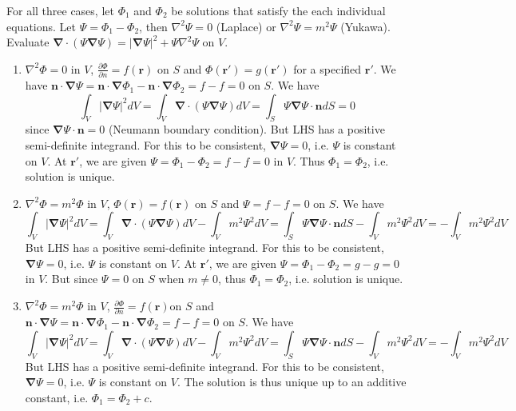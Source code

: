 \documentclass[a4paper]{article}
\begin{document}
\begin{ans}
For all three cases, let $\Phi_1$ and $\Phi_2$ be solutions that satisfy the each individual equations. Let $\Psi=\Phi_1-\Phi_2$, then $\nabla^2\Psi=0$ (Laplace) or $\nabla^2\Psi=m^2\Psi$ (Yukawa). Evaluate $\boldsymbol{\nabla}\cdot(\Psi\boldsymbol{\nabla}\Psi)=|\boldsymbol{\nabla}\Psi|^2+\Psi\nabla^2\Psi$ on $V$.
\begin{enumerate}[label=(\roman*)]
\item $\nabla^2\Phi=0$ in $V$, $\frac{\partial\Phi}{\partial n}=f(\mathbf{r})$ on $S$ and $\Phi(\mathbf{r'})=g(\mathbf{r'})$ for a specified $\mathbf{r'}$. We have $\mathbf{n}\cdot\boldsymbol{\nabla}\Psi=\mathbf{n}\cdot\boldsymbol{\nabla}\Phi_1-\mathbf{n}\cdot\boldsymbol{\nabla}\Phi_2=f-f=0$ on $S$. We have
$$\int_V|\boldsymbol{\nabla}\Psi|^2dV=\int_V\boldsymbol{\nabla}\cdot(\Psi\boldsymbol{\nabla}\Psi)dV=\int_S\Psi\boldsymbol{\nabla}\Psi\cdot\mathbf{n}dS=0$$
since $\boldsymbol{\nabla}\Psi\cdot\mathbf{n}=0$ (Neumann boundary condition). But LHS has a positive semi-definite integrand. For this to be consistent, $\boldsymbol{\nabla}\Psi=0$, i.e. $\Psi$ is constant on $V$. At $\mathbf{r'}$, we are given $\Psi=\Phi_1-\Phi_2=f-f=0$ in $V$. Thus $\Phi_1=\Phi_2$, i.e. solution is unique.
\item $\nabla^2\Phi=m^2\Phi$ in $V$, $\Phi(\mathbf{r})=f(\mathbf{r})$ on $S$ and $\Psi=f-f=0$ on $S$. We have
$$\int_V|\boldsymbol{\nabla}\Psi|^2dV=\int_V\boldsymbol{\nabla}\cdot(\Psi\boldsymbol{\nabla}\Psi)dV-\int_Vm^2\Psi^2dV=\int_S\Psi\boldsymbol{\nabla}\Psi\cdot\mathbf{n}dS-\int_Vm^2\Psi^2dV=-\int_Vm^2\Psi^2dV$$
But LHS has a positive semi-definite integrand. For this to be consistent, $\boldsymbol{\nabla}\Psi=0$, i.e. $\Psi$ is constant on $V$. At $\mathbf{r'}$, we are given $\Psi=\Phi_1-\Phi_2=g-g=0$ in $V$. But since $\Psi=0$ on $S$ when $m\neq 0$, thus $\Phi_1=\Phi_2$, i.e. solution is unique.
\item $\nabla^2\Phi=m^2\Phi$ in $V$, $\frac{\partial\Phi}{\partial n}=f(\mathbf{r})$on $S$ and $\mathbf{n}\cdot\boldsymbol{\nabla}\Psi=\mathbf{n}\cdot\boldsymbol{\nabla}\Phi_1-\mathbf{n}\cdot\boldsymbol{\nabla}\Phi_2=f-f=0$ on $S$. We have
$$\int_V|\boldsymbol{\nabla}\Psi|^2dV=\int_V\boldsymbol{\nabla}\cdot(\Psi\boldsymbol{\nabla}\Psi)dV-\int_Vm^2\Psi^2dV=\int_S\Psi\boldsymbol{\nabla}\Psi\cdot\mathbf{n}dS-\int_Vm^2\Psi^2dV=-\int_Vm^2\Psi^2dV$$
But LHS has a positive semi-definite integrand. For this to be consistent, $\boldsymbol{\nabla}\Psi=0$, i.e. $\Psi$ is constant on $V$. The solution is thus unique up to an additive constant, i.e. $\Phi_1=\Phi_2+c$.
\end{enumerate}
\end{ans}
\end{document}

